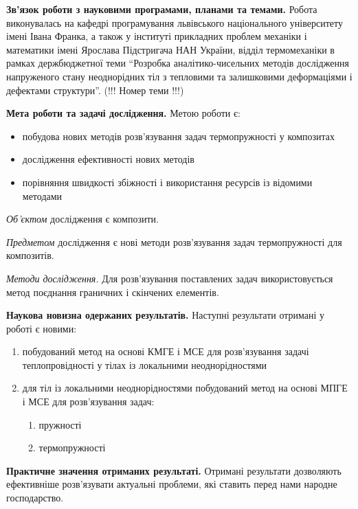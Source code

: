\textbf{Зв'язок роботи з науковими програмами, планами та
темами.} Робота виконувалась на кафедрі програмування львівського
національного університету імені Івана Франка, а також у інституті
прикладних проблем механіки і математики імені Ярослава Підстригача НАН
України, відділ термомеханіки в рамках держбюджетної теми ``Розробка
аналітико-чисельних методів дослідження напруженого стану неоднорідних
тіл з тепловими та залишковими деформаціями і дефектами структури''.
(!!! Номер теми !!!)

\textbf{Мета роботи та задачі дослідження.} Метою роботи є:

\begin{itemize}
\item
  побудова нових методів розв'язування задач термопружності у композитах
\item
  дослідження ефективності нових методів
\item
  порівняння швидкості збіжності і використання ресурсів із відомими
  методами
\end{itemize}

\emph{Об'єктом} дослідження є композити.

\emph{Предметом} дослідження є нові методи розв'язування задач
термопружності для композитів.

\emph{Методи дослідження.} Для розв'язування поставлених задач
використовується метод поєднання граничних і скінчених елементів.

\textbf{Наукова новизна одержаних результатів.} Наступні
результати отримані у роботі є новими:

\begin{enumerate}
\def\labelenumi{\arabic{enumi}.}
\item
  побудований метод на основі КМГЕ і МСЕ для розв'язування задачі
  теплопровідності у тілах із локальними неоднорідностями
\item
  для тіл із локальними неоднорідностями побудований метод на основі
  МПГЕ і МСЕ для розв'язування задач:

  \begin{enumerate}
  \def\labelenumii{\alph{enumii}.}
  \item
    пружності
  \item
    термопружності
  \end{enumerate}
\end{enumerate}

\textbf{Практичне значення отриманих результаті.} Отримані
результати дозволяють ефективніше розв'язувати актуальні проблеми, які
ставить перед нами народне господарство.


